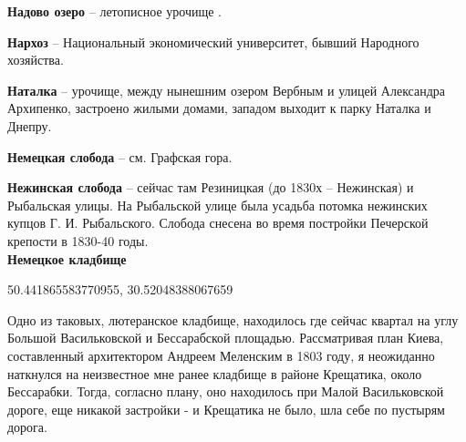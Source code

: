 




\textbf{Надово озеро} – летописное урочище 
.\\


\medskip


\textbf{Нархоз} – Национальный экономический университет, бывший Народного хозяйства.\\


\medskip


\textbf{Наталка} – урочище, между нынешним озером Вербным и улицей Александра Архипенко, застроено жилыми домами, западом выходит к парку Наталка и Днепру.\\



\medskip

\textbf{Немецкая слобода} – см. Графская гора.\\


\medskip


\textbf{Нежинская слобода} – сейчас там Резиницкая (до 1830х – Нежинская) и Рыбальская улицы. На Рыбальской улице была усадьба потомка нежинских купцов Г. И. Рыбальского. Слобода снесена во время постройки Печерской крепости в 1830-40 годы.\\ 

\textbf{Немецкое кладбище} 

50.441865583770955, 30.52048388067659

Одно из таковых, лютеранское кладбище, находилось где сейчас квартал на углу Большой Васильковской и Бессарабской площадью. 
Рассматривая план Киева, составленный архитектором Андреем Меленским в 1803 году,  я неожиданно наткнулся на неизвестное мне ранее кладбище в районе Крещатика, около Бессарабки. Тогда, согласно плану, оно находилось при Малой Васильковской дороге, еще никакой застройки - и Крещатика не было, шла себе по пустырям дорога.

